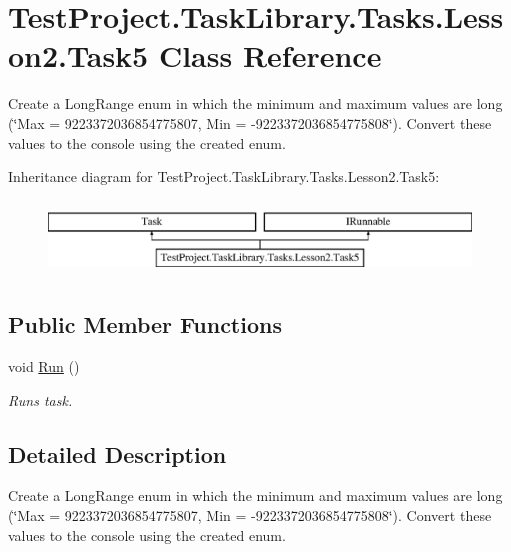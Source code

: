 \hypertarget{class_test_project_1_1_task_library_1_1_tasks_1_1_lesson2_1_1_task5}{}\section{Test\+Project.\+Task\+Library.\+Tasks.\+Lesson2.\+Task5 Class Reference}
\label{class_test_project_1_1_task_library_1_1_tasks_1_1_lesson2_1_1_task5}


Create a Long\+Range enum in which the minimum and maximum values are long (\char`\"{}\+Max = 9223372036854775807, Min = -\/9223372036854775808\char`\"{}). Convert these values to the console using the created enum.  


Inheritance diagram for Test\+Project.\+Task\+Library.\+Tasks.\+Lesson2.\+Task5\+:\begin{figure}[H]
\begin{center}
\leavevmode
\includegraphics[height=2.000000cm]{class_test_project_1_1_task_library_1_1_tasks_1_1_lesson2_1_1_task5}
\end{center}
\end{figure}
\subsection*{Public Member Functions}
\begin{DoxyCompactItemize}
\item 
void \mbox{\hyperlink{class_test_project_1_1_task_library_1_1_tasks_1_1_lesson2_1_1_task5_a2ee534c9d0a591e99b5d8bf5062e1a97}{Run}} ()
\begin{DoxyCompactList}\small\item\em Runs task. \end{DoxyCompactList}\end{DoxyCompactItemize}


\subsection{Detailed Description}
Create a Long\+Range enum in which the minimum and maximum values are long (\char`\"{}\+Max = 9223372036854775807, Min = -\/9223372036854775808\char`\"{}). Convert these values to the console using the created enum. 



